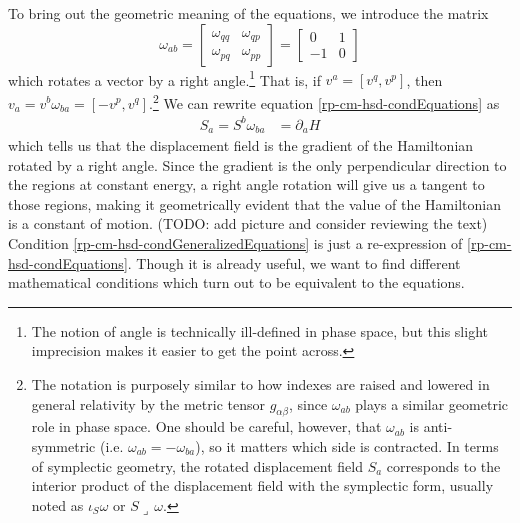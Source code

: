 To bring out the geometric meaning of the equations, we introduce the matrix
\begin{equation}\label{rp-cm-symplectic1d}
	\tag{SF-1}
	\omega_{ab} = \left[\begin{array}{cc}
		\omega_{qq} & \omega_{qp} \\
		\omega_{pq} & \omega_{pp} 
	\end{array} \right]= \left[\begin{array}{cc}
		0 & 1 \\
		-1 & 0 
	\end{array} \right]
\end{equation}
which rotates a vector by a right angle.\footnote{The notion of angle is technically ill-defined in phase space, but this slight imprecision makes it easier to get the point across.} That is, if $v^a = [v^q, v^p]$, then $v_a = v^b \omega_{ba}  = [-v^p, v^q]$.\footnote{The notation is purposely similar to how indexes are raised and lowered in general relativity by the metric tensor $g_{\alpha\beta}$, since $\omega_{ab}$ plays a similar geometric role in phase space. One should be careful, however, that $\omega_{ab}$ is anti-symmetric (i.e. $\omega_{ab} = - \omega_{ba}$), so it matters which side is contracted. In terms of symplectic geometry, the rotated displacement field $S_a$ corresponds to the interior product of the displacement field with the symplectic form, usually noted as $\iota_S \omega$ or $S \lrcorner \, \omega$.} We can rewrite equation \ref{rp-cm-hsd-condEquations} as
\begin{equation}\label{rp-cm-hsd-condGeneralizedEquations}
	\tag{HM-1G}
	\begin{aligned}
		S_a = S^b \omega_{ba} &= \partial_a H 
	\end{aligned}
\end{equation}
which tells us that the displacement field is the gradient of the Hamiltonian rotated by a right angle. Since the gradient is the only perpendicular direction to the regions at constant energy, a right angle rotation will give us a tangent to those regions, making it geometrically evident that the value of the Hamiltonian is a constant of motion. (TODO: add picture and consider reviewing the text) Condition \ref{rp-cm-hsd-condGeneralizedEquations} is just a re-expression of \ref{rp-cm-hsd-condEquations}. Though it is already useful, we want to find different mathematical conditions which turn out to be equivalent to the equations.

